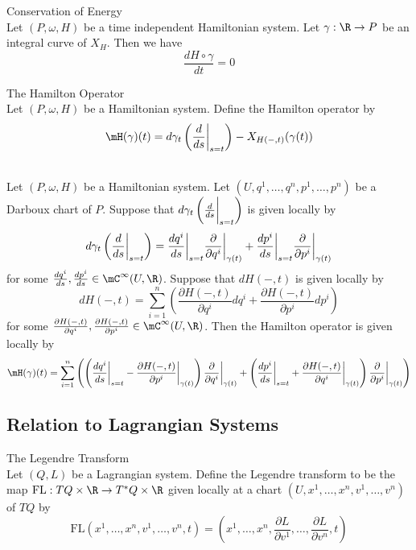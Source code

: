 \documentclass[a4paper]{article}
\begin{document}
\begin{thm}{Conservation of Energy}{}\\
Let $(P,\omega,H)$ be a time independent Hamiltonian system. Let $\gamma:\R\to P$ be an integral curve of $X_H$. Then we have $$\frac{dH\circ\gamma}{dt}=0$$
\end{thm}

\begin{defn}{The Hamilton Operator}{}\\
Let $(P,\omega,H)$ be a Hamiltonian system. Define the Hamilton operator by $$\mH(\gamma)(t)=d\gamma_t\left(\frac{d}{ds}\bigg{|}_{s=t}\right)-X_{H(-,t)}(\gamma(t))$$
\end{defn}

\begin{prp}{}{}\\
Let $(P,\omega,H)$ be a Hamiltonian system. Let $(U,q^1,\dots,q^n,p^1,\dots,p^n)$ be a Darboux chart of $P$. Suppose that $d\gamma_t\left(\frac{d}{ds}\bigg{|}_{s=t}\right)$ is given locally by $$d\gamma_t\left(\frac{d}{ds}\bigg{|}_{s=t}\right)=\frac{dq^i}{ds}\bigg{|}_{s=t}\frac{\partial}{\partial q^i}\bigg{|}_{\gamma(t)}+\frac{dp^i}{ds}\bigg{|}_{s=t}\frac{\partial}{\partial p^i}\bigg{|}_{\gamma(t)}$$ for some $\frac{dq^i}{ds},\frac{dp^i}{ds}\in\mC^\infty(U,\R)$. Suppose that $dH(-,t)$ is given locally by $$dH(-,t)=\sum_{i=1}^n\left(\frac{\partial H(-,t)}{\partial q^i}dq^i+\frac{\partial H(-,t)}{\partial p^i}dp^i\right)$$ for some $\frac{\partial H(-,t)}{\partial q^i},\frac{\partial H(-,t)}{\partial p^i}\in\mC^\infty(U,\R)$. Then the Hamilton operator is given locally by $$\mH(\gamma)(t)=\sum_{i=1}^n\left(\left(\frac{dq^i}{ds}\bigg{|}_{s=t}-\frac{\partial H(-,t)}{\partial p^i}\bigg{|}_{\gamma(t)}\right)\frac{\partial}{\partial q^i}\bigg{|}_{\gamma(t)}+\left(\frac{dp^i}{ds}\bigg{|}_{s=t}+\frac{\partial H(-,t)}{\partial q^i}\bigg{|}_{\gamma(t)}\right)\frac{\partial}{\partial p^i}\bigg{|}_{\gamma(t)}\right)$$
\end{prp}

\subsection{Relation to Lagrangian Systems}
\begin{defn}{The Legendre Transform}{}\\
Let $(Q,L)$ be a Lagrangian system. Define the Legendre transform to be the map $\text{FL}:TQ\times\R\to T^\ast Q\times\R$ given locally at a chart $(U,x^1,\dots,x^n,v^1,\dots,v^n)$ of $TQ$ by $$\text{FL}(x^1,\dots,x^n,v^1,\dots,v^n,t)=\left(x^1,\dots,x^n,\frac{\partial L}{\partial v^1},\dots,\frac{\partial L}{\partial v^n},t\right)$$
\end{defn}
\end{document}
